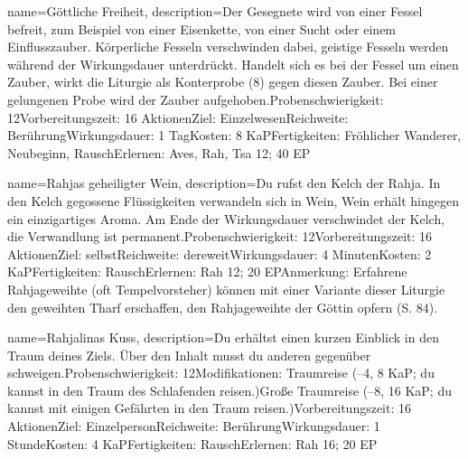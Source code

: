 {
    name={Göttliche Freiheit},
    description={Der Gesegnete wird von einer Fessel befreit, zum Beispiel von einer Eisenkette, von einer Sucht oder einem Einflusszauber. Körperliche Fesseln verschwinden dabei, geistige Fesseln werden während der Wirkungsdauer unterdrückt. Handelt sich es bei der Fessel um einen Zauber, wirkt die Liturgie als Konterprobe (8) gegen diesen Zauber. Bei einer gelungenen Probe wird der Zauber aufgehoben.\newline Probenschwierigkeit: 12\newline Vorbereitungszeit: 16 Aktionen\newline Ziel: Einzelwesen\newline Reichweite: Berührung\newline Wirkungsdauer: 1 Tag\newline Kosten: 8 KaP\newline Fertigkeiten: Fröhlicher Wanderer, Neubeginn, Rausch\newline Erlernen: Aves, Rah, Tsa 12; 40 EP}
}


{
    name={Rahjas geheiligter Wein},
    description={Du rufst den Kelch der Rahja. In den Kelch gegossene Flüssigkeiten verwandeln sich in Wein, Wein erhält hingegen ein einzigartiges Aroma. Am Ende der Wirkungsdauer verschwindet der Kelch, die Verwandlung ist permanent.\newline Probenschwierigkeit: 12\newline Vorbereitungszeit: 16 Aktionen\newline Ziel: selbst\newline Reichweite: dereweit\newline Wirkungsdauer: 4 Minuten\newline Kosten: 2 KaP\newline Fertigkeiten: Rausch\newline Erlernen: Rah 12; 20 EP\newline Anmerkung: Erfahrene Rahjageweihte (oft Tempelvorsteher) können mit einer Variante dieser Liturgie den geweihten Tharf erschaffen, den Rahjageweihte der Göttin opfern (S. 84).}
}


{
    name={Rahjalinas Kuss},
    description={Du erhältst einen kurzen Einblick in den Traum deines Ziels. Über den Inhalt musst du anderen gegenüber schweigen.\newline Probenschwierigkeit: 12\newline Modifikationen: Traumreise (–4, 8 KaP; du kannst in den Traum des Schlafenden reisen.)\newline Große Traumreise (–8, 16 KaP; du kannst mit einigen Gefährten in den Traum reisen.)\newline Vorbereitungszeit: 16 Aktionen\newline Ziel: Einzelperson\newline Reichweite: Berührung\newline Wirkungsdauer: 1 Stunde\newline Kosten: 4 KaP\newline Fertigkeiten: Rausch\newline Erlernen: Rah 16; 20 EP}
}


